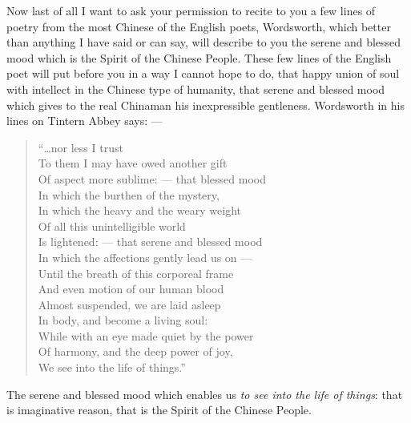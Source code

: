 Now last of all I want to ask your permission to recite to you a few lines of poetry from the most Chinese of the English poets, Wordsworth,  which better than anything I have said or can say, will describe to you the serene and blessed mood which is the Spirit of the Chinese People.
These few lines of the English poet will put before you in a way I cannot hope to do, that happy union of soul with intellect in the Chinese type of humanity, that serene and blessed mood which gives to the real Chinaman his inexpressible gentleness.
Wordsworth in his lines on Tintern Abbey  says: ---
\begin{quote}\footnotesize
   ``\dots nor less I trust \\
   To them I may have owed another gift \\
   Of aspect more sublime: --- that blessed mood \\
   In which the burthen of the mystery, \\
   In which the heavy and the weary weight \\
   Of all this unintelligible world \\
   Is lightened: --- that serene and blessed mood \\
   In which the affections gently lead us on --- \\
   Until the breath of this corporeal frame \\
   And even motion of our human blood \\
   Almost suspended, we are laid asleep \\
   In body, and become a living soul: \\
   While with an eye made quiet by the power \\
   Of harmony, and the deep power of joy, \\
   We see into the life of things.''   
\end{quote}


The serene and blessed mood which enables us \emph{to see into the life of things}: that is imaginative reason, that is the Spirit of the Chinese People.

